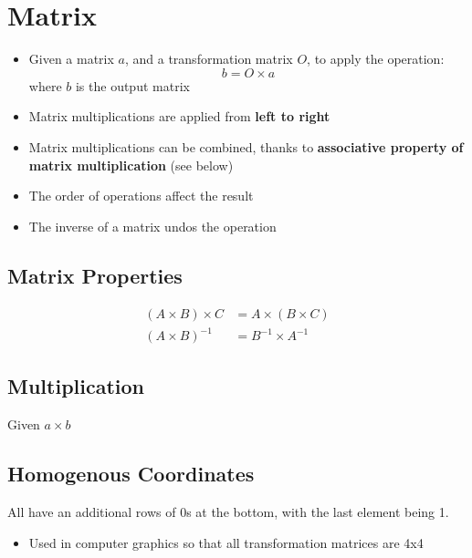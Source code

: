 \chapter{Matrix}

\begin{itemize}
  \item Given a matrix $ a $, and a transformation matrix $ O $, to apply
  the operation:
  \begin{equation}
    b = O \times a
  \end{equation}
  where $ b $ is the output matrix

  \item Matrix multiplications are applied from \textbf{left to right}
  \item Matrix multiplications can be combined, thanks to \textbf{associative
  property of matrix multiplication} (see below)
  \item The order of operations affect the result
  \item The inverse of a matrix undos the operation
\end{itemize}

\section{Matrix Properties}

  \begin{align}
    \left( A \times B \right) \times C &= A \times \left( B \times C \right) \\
    \left( A \times B \right)^{-1} &= B^{-1} \times A^{-1}
  \end{align}

\section{Multiplication}

  Given $ a \times b $

  \begin{algorithm}[H]
  \end{algorithm}

\section{Homogenous Coordinates}

  All have an additional rows of 0s at the bottom, with the last element
  being 1.

  \begin{itemize}
    \item Used in computer graphics so that all transformation matrices
    are 4x4
  \end{itemize}
